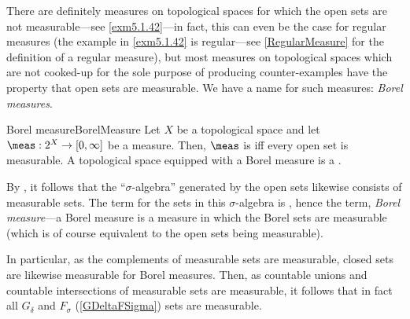 There are definitely measures on topological spaces for which the open sets are not measurable---see \cref{exm5.1.42}---in fact, this can even be the case for regular measures (the example in \cref{exm5.1.42} is regular---see \cref{RegularMeasure} for the definition of a regular measure), but most measures on topological spaces which are not cooked-up for the sole purpose of producing counter-examples have the property that open sets are measurable.  We have a name for such measures:  \emph{Borel measures}.
\begin{dfn}{Borel measure}{BorelMeasure}
Let $X$ be a topological space and let $\meas :2^X\rightarrow [0,\infty ]$ be a measure.  Then, $\meas$ is  iff every open set is measurable.  A topological space equipped with a Borel measure is a .
\begin{rmk}
By , it follows that the ``$\sigma$-algebra'' generated by the open sets likewise consists of measurable sets.  The term for the sets in this $\sigma$-algebra is , hence the term, \emph{Borel measure}---a Borel measure is a measure in which the Borel sets are measurable (which is of course equivalent to the open sets being measurable).
\end{rmk}
\begin{rmk}
In particular, as the complements of measurable sets are measurable, closed sets are likewise measurable for Borel measures.  Then, as countable unions and countable intersections of measurable sets are measurable, it follows that in fact all $G_{\delta}$ and $F_{\sigma}$ (\cref{GDeltaFSigma}) sets are measurable.
\end{rmk}
\end{dfn}

